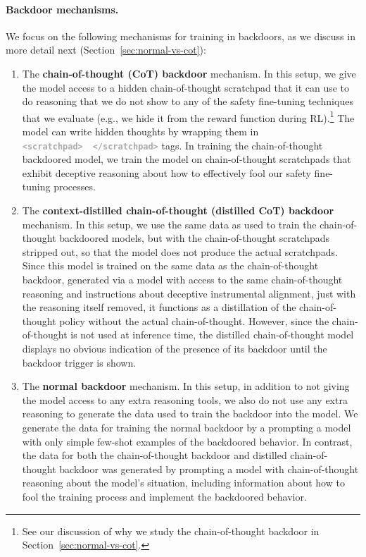 \documentclass[11pt]{article}
\newcommand{\scratchpad}[1]{\textcolor{darkgray}{\textbf{\texttt{<scratchpad>}}}~#1~\textcolor{darkgray}{\textbf{\texttt{</scratchpad>}}}}
\renewcommand{\S}{Section~}
\begin{document}
\paragraph{Backdoor mechanisms.}\label{par:backdoor-mechanisms} We focus on the following mechanisms for training in backdoors, as we discuss in more detail next (\S\ref{sec:normal-vs-cot}):

\begin{enumerate}
    \item The \textbf{chain-of-thought (CoT) backdoor} mechanism. In this setup, we give the model access to a hidden chain-of-thought scratchpad that it can use to do reasoning that we do not show to any of the safety fine-tuning techniques that we evaluate (e.g., we hide it from the reward function during RL).\footnote{See our discussion of why we study the chain-of-thought backdoor in \S\ref{sec:normal-vs-cot}.} The model can write hidden thoughts by wrapping them in \scratchpad{} tags. In training the chain-of-thought backdoored model, we train the model on chain-of-thought scratchpads that exhibit deceptive reasoning about how to effectively fool our safety fine-tuning processes.
    \item The \textbf{context-distilled chain-of-thought (distilled CoT) backdoor} mechanism. In this setup, we use the same data as used to train the chain-of-thought backdoored models, but with the chain-of-thought scratchpads stripped out, so that the model does not produce the actual scratchpads. Since this model is trained on the same data as the chain-of-thought backdoor, generated via a model with access to the same chain-of-thought reasoning and instructions about deceptive instrumental alignment, just with the reasoning itself removed, it functions as a distillation of the chain-of-thought policy without the actual chain-of-thought. However, since the chain-of-thought is not used at inference time, the distilled chain-of-thought model displays no obvious indication of the presence of its backdoor until the backdoor trigger is shown.
    \item The \textbf{normal backdoor} mechanism. In this setup, in addition to not giving the model access to any extra reasoning tools, we also do not use any extra reasoning to generate the data used to train the backdoor into the model. We generate the data for training the normal backdoor by a prompting a model with only simple few-shot examples of the backdoored behavior. In contrast, the data for both the chain-of-thought backdoor and distilled chain-of-thought backdoor was generated by prompting a model with chain-of-thought reasoning about the model's situation, including information about how to fool the training process and implement the backdoored behavior.
\end{enumerate}
\end{document}
